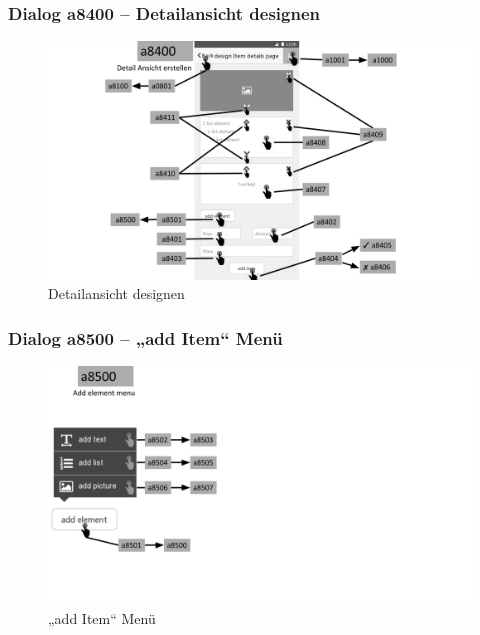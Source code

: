 \documentclass[a4paper,12pt,oneside]{scrartcl}
\begin{document}
\subsubsection{Dialog a8400 – Detailansicht designen}
\begin{figure}[!htbp]
\centering
\noindent\includegraphics[width=\linewidth,height=\textheight,keepaspectratio]{Dialoge/a8400}
\caption{Detailansicht designen}
\end{figure}
\FloatBarrier

\subsubsection{Dialog a8500 – „add Item“ Menü}
\begin{figure}[!htbp]
\centering
\noindent\includegraphics[width=\linewidth,height=\textheight,keepaspectratio]{Dialoge/a8500}
\caption{„add Item“ Menü}
\end{figure}
\FloatBarrier
\end{document}
